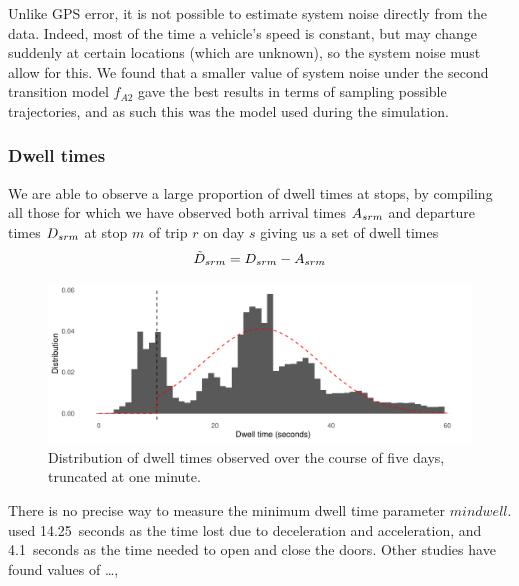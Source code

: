 Unlike GPS error, it is not possible to estimate system noise directly from the data. Indeed, most of the time a vehicle's speed is constant, but may change suddenly at certain locations (which are unknown), so the system noise must allow for this. We found that a smaller value of system noise under the second transition model $f_{A2}$ gave the best results in terms of sampling possible trajectories, and as such this was the model used during the simulation.



\subsubsection{Dwell times}
\label{sec:pf_params_dwell}

We are able to observe a large proportion of dwell times at stops, by compiling all those for which we have observed both arrival times $A_{srm}$ and departure times $D_{srm}$ at stop $m$ of trip $r$ on day $s$ giving us a set of dwell times
\begin{equation}
\label{eq:dwell_time_obs}
\tilde{D}_{srm} = D_{srm} - A_{srm}
\end{equation}

\begin{knitrout}\small
{}\color{fgcolor}\begin{figure}
\includegraphics[width=\linewidth]{figure/observed_dwell-1} \caption[Distribution of dwell times observed over the course of five days, truncated at one minute]{Distribution of dwell times observed over the course of five days, truncated at one minute.}\label{fig:observed_dwell}
\end{figure}


\end{knitrout}

There is no precise way to measure the minimum dwell time parameter $mindwell$. \citet{Hans_2015} used 14.25~seconds as the time lost due to deceleration and acceleration, and 4.1~seconds as the time needed to open and close the doors. Other studies have found values of \ldots,


